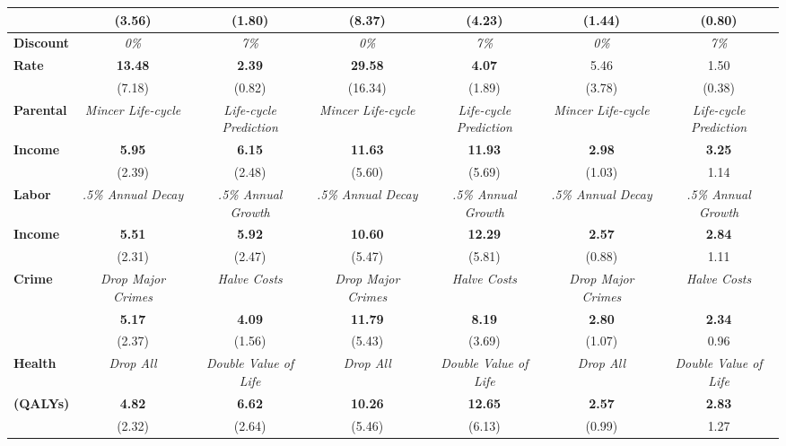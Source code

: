 \begin{tabular}{>{\bfseries}lcc|cc|cc}
	&	(3.56)	&	(1.80)	&	(8.37)	&	(4.23)	&	(1.44)	&	(0.80)	\\ \midrule
Discount 	&	\textit{0\%}	&	\textit{7\%}	&	\textit{0\%}	&	\textit{7\%}	&	\textit{0\%}	&	\textit{7\%}	\\
Rate	&	\textbf{13.48}	&	\textbf{2.39}	&	\textbf{29.58}	&	\textbf{4.07}	&	5.46	&	1.50	\\
	&	(7.18)	&	(0.82)	&	(16.34)	&	(1.89)	&	(3.78)	&	(0.38)	\\ \midrule
Parental	&	\textit{Mincer Life-cycle}	&	\textit{Life-cycle Prediction}	&	\textit{Mincer Life-cycle}	&	\textit{Life-cycle Prediction}	&	\textit{Mincer Life-cycle}	&	\textit{Life-cycle Prediction}	\\
Income	&	\textbf{5.95}	&	\textbf{6.15}	&	\textbf{11.63}	&	\textbf{11.93}	&	\textbf{2.98}	&	\textbf{3.25}	\\
	&	(2.39)	&	(2.48)	&	(5.60)	&	(5.69)	&	(1.03)	&	1.14	\\ \midrule
Labor	&	\textit{.5\% Annual Decay}	&	\textit{.5\% Annual Growth}	&	\textit{.5\% Annual Decay}	&	\textit{.5\% Annual Growth}	&	\textit{.5\% Annual Decay}	&	\textit{.5\% Annual Growth}	\\
Income	&	\textbf{5.51}	&	\textbf{5.92}	&	\textbf{10.60}	&	\textbf{12.29}	&	\textbf{2.57}	&	\textbf{2.84}	\\
	&	(2.31)	&	(2.47)	&	(5.47)	&	(5.81)	&	(0.88)	&	1.11	\\ \midrule
Crime	&	\textit{Drop Major Crimes}	&	\textit{Halve Costs}	&	\textit{Drop Major Crimes}	&	\textit{Halve Costs}	&	\textit{Drop Major Crimes}	&	\textit{Halve Costs}	\\
	&	\textbf{5.17}	&	\textbf{4.09}	&	\textbf{11.79}	&	\textbf{8.19}	&	\textbf{2.80}	&	\textbf{2.34}	\\
	&	(2.37)	&	(1.56)	&	(5.43)	&	(3.69)	&	(1.07)	&	0.96	\\ \midrule
Health	&	\textit{Drop All}	&	\textit{Double Value of Life}	&	\textit{Drop All}	&	\textit{Double Value of Life}	&	\textit{Drop All}	&	\textit{Double Value of Life}	\\
(QALYs)	&	\textbf{4.82}	&	\textbf{6.62}	&	\textbf{10.26}	&	\textbf{12.65}	&	\textbf{2.57}	&	\textbf{2.83}	\\
	&	(2.32)	&	(2.64)	&	(5.46)	&	(6.13)	&	(0.99)	&	1.27	\\ \bottomrule
\end{tabular} 